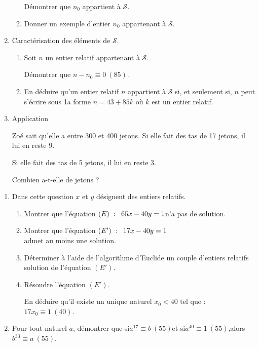 \documentclass{cornouaille}
\begin{document}
\begin{exercice}
\begin{enumerate}
\begin{enumerate}
Démontrer que $n_0$ appartient à $\mathcal{S}$.

\item Donner un exemple d'entier $n_0$ appartenant à $\mathcal{S}$.
\end{enumerate}

\item Caractérisation des éléments de $\mathcal{S}$.
\begin{enumerate}
\item Soit $n$ un entier relatif appartenant à $\mathcal{S}$.
 
Démontrer que $n-n_0\equiv0~(85)$.

\item En déduire qu'un entier relatif $n$ appartient à $\mathcal{S}$
  si, et seulement si, $n$ peut s'écrire sous 1a forme $n=43+85k$ où
  $k$ est un entier relatif.
\end{enumerate}

\item Application

Zoé sait qu'elle a entre 300 et 400 jetons. Si elle fait des tas de 17
jetons, il lui en reste 9. 

Si elle fait des tas de 5 jetons, il lui en reste 3.

Combien a-t-elle de jetons ?
\end{enumerate}
\end{exercice}




\begin{exercice}
\begin{enumerate}
\item Dans cette question $x$ et $y$ désignent des entiers relatifs.
\begin{enumerate}
\item Montrer que l'équation $(E)~:\enskip 65x - 40y = 1$\enskip n'a pas de solution.\medskip

\item Montrer que l'équation $(E')~:\enskip 17x - 40y = 1$\\ admet au moins une  solution.\medskip

\item Déterminer à l'aide de l'algorithme d'Euclide un couple d'entiers relatifs solution de l'équation $\left(E'\right)$.
	
\item Résoudre l'équation $\left(E'\right)$.
	
En déduire qu'il existe un unique naturel $x_{0}<40$ tel que : $17x_{0}\equiv 1~(40)$.\medskip
	\end{enumerate}
	
\item Pour tout naturel $a$, démontrer que si\enskip $a^{17} \equiv b~(55)$\enskip et si\enskip $a^{40} \equiv 1~(55)$,\enskip alors\enskip $b^{33} \equiv a~(55)$.
\end{enumerate}
\end{exercice}
\end{document}
